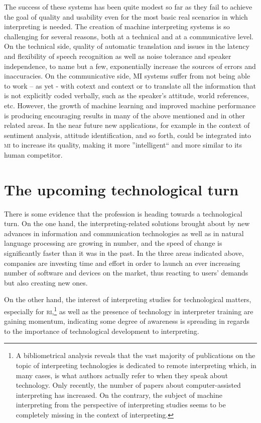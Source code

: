 \documentclass[output=paper]{langsci/langscibook}
\begin{document}
The success of these systems has been quite modest so far as they fail to achieve the goal of quality and usability even for the most basic real scenarios in which interpreting is needed. The creation of machine interpreting systems is so challenging for several reasons, both at a technical and at a communicative level. On the technical side, quality of automatic translation and issues in the latency and flexibility of speech recognition as well as noise tolerance and speaker independence, to name but a few, exponentially increase the sources of errors and inaccuracies. On the communicative side, \textsc{MI} systems suffer from not being able to work – as yet - with cotext and context or to translate all the information that is not explicitly coded verbally, such as the speaker's attitude, world references, etc. However, the growth of machine learning and improved machine performance is producing encouraging results in many of the above mentioned and in other related areas. In the near future new applications, for example in the context of sentiment analysis, attitude identification, and so forth, could be integrated into \textsc{mi} to increase its quality, making it more ''intelligent`` and more similar to its human competitor. 
 
\section{The upcoming technological turn} 
There is some evidence that the profession is heading towards a technological turn. On the one hand, the interpreting-related solutions brought about by new advances in information and communication technologies as well as in natural language processing are growing in number, and the speed of change is significantly faster than it was in the past. In the three areas indicated above, companies are investing time and effort in order to launch an ever increasing number of software and devices on the market, thus reacting to users’ demands but also creating new ones.  
 
   
On the other hand, the interest of interpreting studies for technological matters, especially for \textsc{ri},\footnote{A bibliometrical analysis reveals that the vast majority of publications on the topic of interpreting technologies is dedicated to remote interpreting which, in many cases, is what authors actually refer to when they speak about technology. Only recently, the number of papers about computer-assisted interpreting has increased. On the contrary, the subject of machine interpreting from the perspective of interpreting studies seems to be completely missing in the context of interpreting.} as well as the presence of technology in interpreter training are gaining momentum, indicating some degree of awareness is spreading in regards to the importance of technological development to interpreting. 
 
\end{document}
